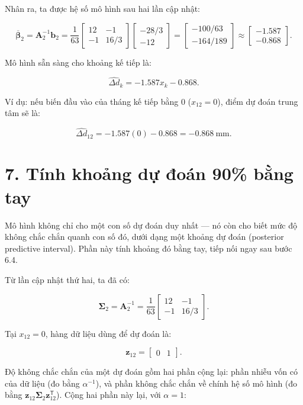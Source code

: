 \documentclass[12pt]{article}
\begin{document}
Nhân ra, ta được hệ số mô hình sau hai lần cập nhật:

\[
\overline{\boldsymbol{\beta}}_2
=
\boldsymbol{A}_2^{-1}\boldsymbol{b}_2
=
\frac{1}{63}
\begin{bmatrix}
12 & -1\\
-1 & 16/3
\end{bmatrix}
\begin{bmatrix}
-28/3\\
-12
\end{bmatrix}
=
\begin{bmatrix}
-100/63\\
-164/189
\end{bmatrix}
\approx
\begin{bmatrix}
-1.587\\
-0.868
\end{bmatrix}.
\]

Mô hình sẵn sàng cho khoảng kế tiếp là:

\[
\widehat{\Delta d}_k
=
-1.587x_k-0.868.
\]

Ví dụ: nếu biến đầu vào của tháng kế tiếp bằng 0 ($x_{12}=0$), điểm dự đoán trung tâm sẽ là:

\[
\widehat{\Delta d}_{12}
=
-1.587(0)-0.868
=
-0.868\ \mathrm{mm}.
\]

\section{7. Tính khoảng dự đoán 90\% bằng tay}

Mô hình không chỉ cho một con số dự đoán duy nhất — nó còn cho biết mức độ không chắc chắn quanh con số đó, dưới dạng một khoảng dự đoán (posterior predictive interval). Phần này tính khoảng đó bằng tay, tiếp nối ngay sau bước 6.4.

Từ lần cập nhật thứ hai, ta đã có:

\[
\boldsymbol{\Sigma}_2
=
\boldsymbol{A}_2^{-1}
=
\frac{1}{63}
\begin{bmatrix}
12 & -1\\
-1 & 16/3
\end{bmatrix}.
\]

Tại $x_{12}=0$, hàng dữ liệu dùng để dự đoán là:

\[
\boldsymbol{z}_{12}
=
\begin{bmatrix}
0 & 1
\end{bmatrix}.
\]

Độ không chắc chắn của một dự đoán gồm hai phần cộng lại: phần nhiễu vốn có của dữ liệu (đo bằng $\alpha^{-1}$), và phần không chắc chắn về chính hệ số mô hình (đo bằng $\boldsymbol{z}_{12}\boldsymbol{\Sigma}_2\boldsymbol{z}_{12}^{\mathsf{T}}$). Cộng hai phần này lại, với $\alpha=1$:
\end{document}
